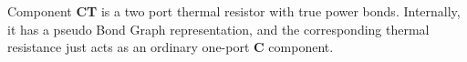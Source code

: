 
Component \textbf{CT} is a two port thermal resistor with true power
bonds. Internally, it has a pseudo Bond Graph representation, and the
corresponding thermal resistance just acts as an ordinary one-port
\textbf{C} component.

 
